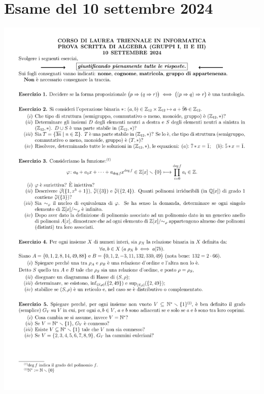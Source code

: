 \section{Esame del 10 settembre 2024}
\begin{center}
	\includegraphics[scale=.85]{pdf/24-09-10.pdf}
\end{center}

